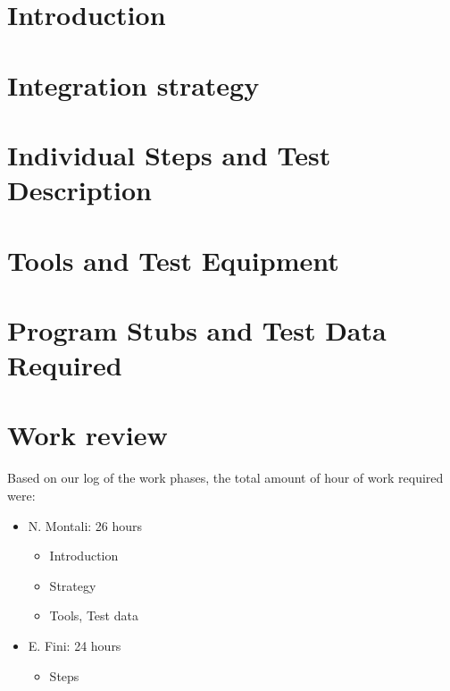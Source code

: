 \documentclass[a4paper,12pt,oneside]{book}
\begin{document}
	\begin{flushleft}
	\chapter{Introduction}\label{cap:Intro}
	
	\chapter{Integration strategy}\label{cap:Strategy}
	
	\chapter{Individual Steps and Test Description}\label{cap:Steps}
	
	\chapter{Tools and Test Equipment}\label{cap:Tools}
	
	\chapter{Program Stubs and Test Data Required}\label{cap:Test}
	
	\chapter{Work review}
	Based on our log of the work phases, the total amount of hour of work required were:
	\begin{itemize}
	\item N. Montali: 26 hours 
	\begin{itemize}
		\item Introduction
		\item Strategy
		\item Tools, Test data
	\end{itemize}
	\item E. Fini: 24 hours
	\begin{itemize}
		\item Steps
	\end{itemize}
	\end{itemize}
	\end{flushleft}
\end{document}
